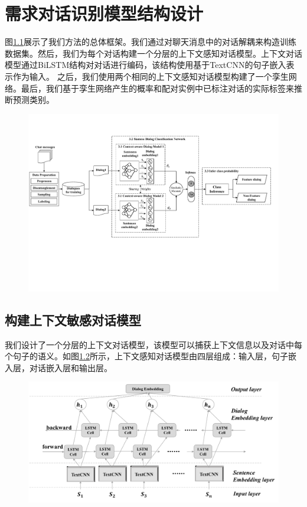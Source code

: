 \chapter{需求对话识别模型结构设计}
图\ref{fig:approach}展示了我们方法的总体框架。我们通过对聊天消息中的对话解耦来构造训练数据集。然后，我们为每个对话构建一个分层的上下文感知对话模型。上下文对话模型通过BiLSTM结构对对话进行编码，该结构使用基于TextCNN的句子嵌入表示作为输入。 之后，我们使用两个相同的上下文感知对话模型构建了一个孪生网络。最后，我们基于孪生网络产生的概率和配对实例中已标注对话的实际标签来推断预测类别。
\begin{figure}[htbp]
    \centering
    \includegraphics[width=\textwidth]{Img/approach.pdf}
    \label{fig:approach}
\end{figure}

\section{构建上下文敏感对话模型}
我们设计了一个分层的上下文对话模型，该模型可以捕获上下文信息以及对话中每个句子的语义。如图\ref{fig:model}所示，上下文感知对话模型由四层组成：输入层，句子嵌入层，对话嵌入层和输出层。
\begin{figure}[htbp]
    \centering
    \includegraphics[width=\textwidth]{Img/dialog-model.pdf}
    \label{fig:model}
\end{figure}

